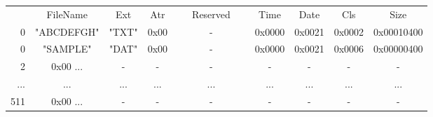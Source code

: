 \documentclass[border=1mm]{standalone}
\begin{document}
\tt\small\begin{tabular}{r | c | c | c | c | c | c | c | c|}
\multicolumn{1}{c}{} &
\multicolumn{1}{c}{FileName} &
\multicolumn{1}{c}{Ext} &
\multicolumn{1}{c}{Atr} &
\multicolumn{1}{c}{~~~Reserved~~~} &
\multicolumn{1}{c}{Time} &
\multicolumn{1}{c}{Date} &
\multicolumn{1}{c}{Cls} &
\multicolumn{1}{c}{Size} \\\cline{2-9}
0 & "ABCDEFGH" & "TXT" &
0x00 & - & 0x0000 & 0x0021 & 0x0002 & 0x00010400 \\\cline{2-9}
0 & "SAMPLE\textvisiblespace\textvisiblespace" & "DAT" &
0x00 & - & 0x0000 & 0x0021 & 0x0006 & 0x00000400 \\\cline{2-9}
2 & 0x00 ... & - &
- & - & - & - & - & - \\\cline{2-9}
... & ... & ... &
... & ... & ... & ... & ... & ... \\\cline{2-9}
511 & 0x00 ... & - &
- & - & - & - & - & - \\\cline{2-9}
\end{tabular}
\end{document}
